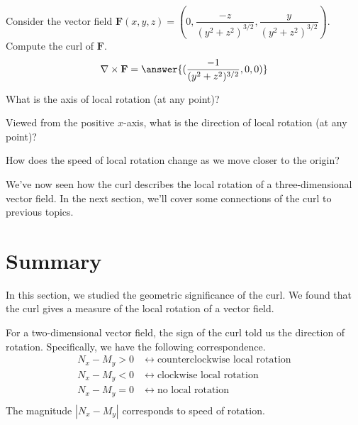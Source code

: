 \documentclass{ximera}
\begin{document}
\begin{problem}
Consider the vector field $\mathbf{F}(x,y,z)=\left(0,\dfrac{-z}{(y^2+z^2)^{3/2}},\dfrac{y}{(y^2+z^2)^{3/2}}\right)$. Compute the curl of $\mathbf{F}$.
\[
\nabla\times\mathbf{F} = \answer{(\frac{-1}{(y^2+z^2)^{3/2}},0,0)}
\]
\begin{problem}
What is the axis of local rotation (at any point)?
\begin{multipleChoice}
\end{multipleChoice}
\begin{problem}
Viewed from the positive $x$-axis, what is the direction of local rotation (at any point)?
\begin{multipleChoice}
\end{multipleChoice}
\begin{problem}
How does the speed of local rotation change as we move closer to the origin?
\begin{multipleChoice}
\end{multipleChoice}
\end{problem}
\end{problem}
\end{problem}
\end{problem}

We've now seen how the curl describes the local rotation of a three-dimensional vector field. In the next section, we'll cover some connections of the curl to previous topics.

\section*{Summary}

In this section, we studied the geometric significance of the curl. We found that the curl gives a measure of the local rotation of a vector field.

For a two-dimensional vector field, the sign of the curl told us the direction of rotation. Specifically, we have the following correspondence.
\begin{align*}
N_x-M_y>0\;&\longleftrightarrow\; \textrm{counterclockwise local rotation}\\
N_x-M_y<0\;&\longleftrightarrow\; \textrm{clockwise local rotation}\\
N_x-M_y=0\;&\longleftrightarrow\; \textrm{no local rotation}\\
\end{align*}
The magnitude $|N_x-M_y|$ corresponds to speed of rotation.
\end{document}
